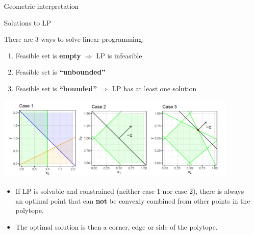 \documentclass[11pt,compress,t,notes=noshow, xcolor=table]{beamer}
\begin{document}
\begin{vbframe}{Geometric interpretation}
\begin{itemize}






\end{itemize}

\end{vbframe}

\begin{vbframe}{Solutions to LP}

There are 3 ways to solve linear programming:

\begin{enumerate}
\item Feasible set is \textbf{empty} $\Rightarrow$ LP is infeasible
\item Feasible set is \textbf{\enquote{unbounded}}
\item Feasible set is \textbf{\enquote{bounded}} $\Rightarrow$ LP has at least one solution
\end{enumerate}

\vspace{\baselineskip}

\begin{center}
    \includegraphics[width=0.9\textwidth]{figure_man/solutions-lp.png}
\end{center}


\framebreak

\begin{itemize}
\item If LP is solvable and constrained (neither case 1 nor case 2), there is always an optimal point that can  \textbf{not} be convexly combined from other points in the polytope.
\item The optimal solution is then a corner, edge or side of the polytope.
\end{itemize}


\end{vbframe}
\end{document}
